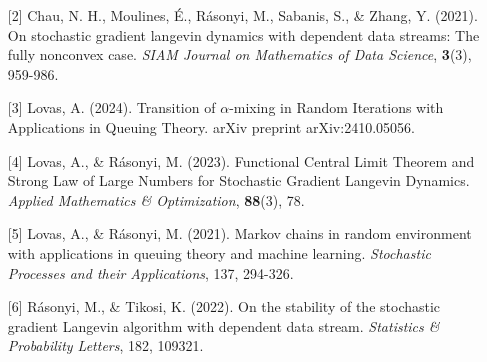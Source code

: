 \begin{talk}
\begin{enumerate}
	\item[{[2]}] Chau, N. H., Moulines, \'E., R\'asonyi, M., Sabanis, S., \& Zhang, Y. (2021). On stochastic gradient langevin dynamics with dependent data streams: The fully nonconvex case. {\it SIAM Journal on Mathematics of Data Science}, \textbf{3}(3), 959-986.
	
	\item[{[3]}] Lovas, A. (2024). Transition of $\alpha $-mixing in Random Iterations with Applications in Queuing Theory. arXiv preprint arXiv:2410.05056.
	
	\item[{[4]}] Lovas, A., \& R\'asonyi, M. (2023). Functional Central Limit Theorem and Strong Law of Large Numbers for Stochastic Gradient Langevin Dynamics. {\it Applied Mathematics \& Optimization}, \textbf{88}(3), 78.
	
	\item[{[5]}] Lovas, A., \& R\'asonyi, M. (2021). Markov chains in random environment with applications in queuing theory and machine learning. {\it Stochastic Processes and their Applications}, 137, 294-326.
	
	\item[{[6]}] R\'asonyi, M., \& Tikosi, K. (2022). On the stability of the stochastic gradient Langevin algorithm with dependent data stream. {\it Statistics \& Probability Letters}, 182, 109321.
	
\end{enumerate}

\end{talk}

